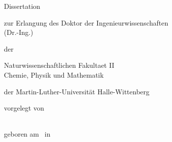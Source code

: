 \begin{titlepage}
    {
        \sffamily

        \vspace{1.5cm}

        \begin{center}
            \textbf{ \Huge \thesisTitleDisplay}

            \vspace{1.5cm}

            \begin{center}
                Dissertation
            \end{center}

            \vspace{1.5cm}

            zur Erlangung des  Doktor der Ingenieurwissenschaften\\[5mm]
            (Dr.-Ing.) \\[2mm]

            \vspace{1.5cm}

            der 
            
            \vspace{1.5cm}

            Naturwissenschaftlichen Fakultaet II\\[2mm]
            Chemie, Physik und Mathematik\\

            \vspace{1cm}

            der Martin-Luther-Universität Halle-Wittenberg

            \vspace{3.5cm}

            vorgelegt von \authorsalutation \\
            \vspace{1.5cm}

            {\Large \thesisAuthor}\\

            geboren am \thesisAuthorDOB\ in \thesisAuthorCity

            \vspace{1.4cm}
        \end{center}
    }

\end{titlepage}